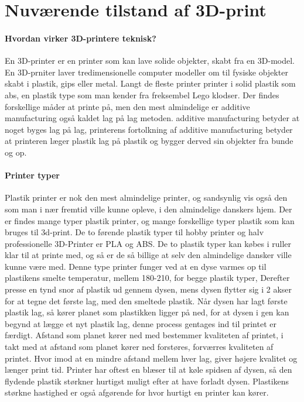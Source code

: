 \chapter{Nuværende tilstand af 3D-print} %
\label{cha:nuv_rende_tilstand_af_3d_print}


\subsubsection{Hvordan virker 3D-printere teknisk?}

En 3D-printer er en printer som kan lave solide objekter, skabt fra en 3D-model. En 3D-prniter laver tredimensionelle computer modeller om til  fysiske objekter skabt i plastik, gips eller metal. Langt de fleste printer printer i solid plastik som abs, en plastik type som man kender fra freksembel Lego klodser. Der findes forskellige måder at printe på, men den mest almindelige er additive manufacturing også kaldet lag på lag metoden. additive manufacturing betyder at noget byges lag på lag, printerens fortolkning af additive manufacturing betyder at printeren læger plastik lag på plastik og bygger derved sin objekter fra bunde og op. 

\subsubsection{Printer typer}

Plastik printer er nok den mest almindelige printer, og sandsynlig vis også den som man i nær fremtid ville kunne opleve, i den almindelige danskers hjem. Der er findes mange typer plastik printer, og mange forskellige typer plastik som kan bruges til 3d-print. De to førende plastik typer til hobby printer og halv professionelle 3D-Printer er PLA og ABS. De to plastik typer kan købes i ruller klar til at printe med, og så er de så billige at selv den almindelige dansker ville kunne være med. 
Denne type printer funger ved at en dyse varmes op til plastikens smelte temperatur, mellem 180-210, for begge plastik typer, Derefter presse en tynd snor af plastik ud gennem dysen, mens dysen flytter sig i 2 akser for at tegne det første lag, med den smeltede plastik. Når dysen har lagt første plastik lag, så kører planet som plastikken ligger på ned, for at dysen i gen kan begynd at lægge et nyt plastik lag, denne process gentages ind til printet er færdigt. Afstand som planet kører ned med bestemmer kvaliteten af printet, i takt med at afstand som planet kører ned forstøres, forværres kvaliteten af printet.  Hvor imod at en mindre afstand mellem hver lag, giver højere kvalitet og længer print tid. Printer har oftest en blæser til at køle spidsen af dysen, så den flydende plastik størkner hurtigst muligt efter at have forladt dysen. Plastikens størkne hastighed er også afgørende for hvor hurtigt en printer kan kører. 

